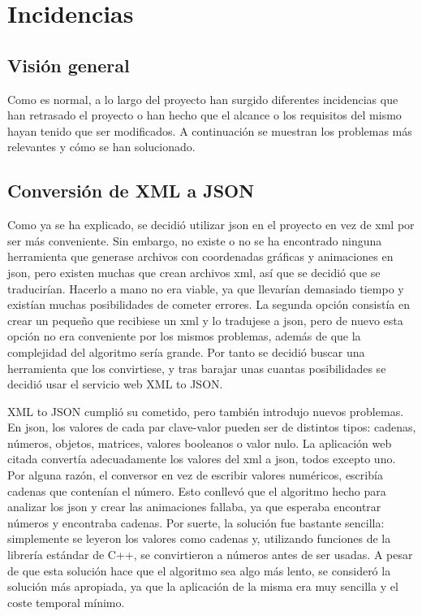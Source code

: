 \chapter{Incidencias}

\section{Visión general}

	Como es normal, a lo largo del proyecto han surgido diferentes incidencias que han retrasado el proyecto o han hecho que el alcance o los requisitos del mismo hayan tenido que ser modificados. A continuación se muestran los problemas más relevantes y cómo se han solucionado.

\section{Conversión de XML a JSON}

	Como ya se ha explicado, se decidió utilizar \acrshort{json} en el proyecto en vez de \acrshort{xml} por ser más conveniente. Sin embargo, no existe o no se ha encontrado ninguna herramienta que generase archivos con coordenadas gráficas y animaciones en \acrshort{json}, pero existen muchas que crean archivos \acrshort{xml}, así que se decidió que se traducirían. Hacerlo a mano no era viable, ya que llevarían demasiado tiempo y existían muchas posibilidades de cometer errores. La segunda opción consistía en crear un pequeño que recibiese un \acrshort{xml} y lo tradujese a \acrshort{json}, pero de nuevo esta opción no era conveniente por los mismos problemas, además de que la complejidad del algoritmo sería grande. Por tanto se decidió buscar una herramienta que los convirtiese, y tras barajar unas cuantas posibilidades se decidió usar el servicio web XML to JSON.

	XML to JSON cumplió su cometido, pero también introdujo nuevos problemas. En \acrshort{json}, los valores de cada par clave-valor pueden ser de distintos tipos: cadenas, números, objetos, matrices, valores booleanos o valor nulo. La aplicación web citada convertía adecuadamente los valores del \acrshort{xml} a \acrshort{json}, todos excepto uno. Por alguna razón, el conversor en vez de escribir valores numéricos, escribía cadenas que contenían el número. Esto conllevó que el algoritmo hecho para analizar los \acrshort{json} y crear las animaciones fallaba, ya que esperaba encontrar números y encontraba cadenas. Por suerte, la solución fue bastante sencilla: simplemente se leyeron los valores como cadenas y, utilizando funciones de la librería estándar de C++, se convirtieron a números antes de ser usadas. A pesar de que esta solución hace que el algoritmo sea algo más lento, se consideró la solución más apropiada, ya que la aplicación de la misma era muy sencilla y el coste temporal mínimo.


